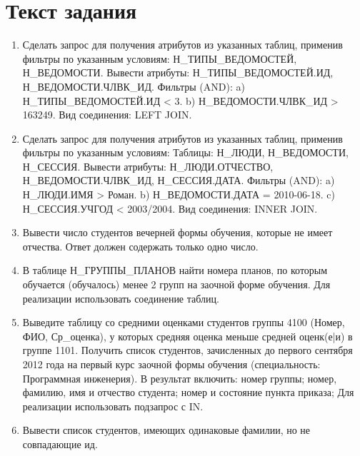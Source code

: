 \documentclass{article}
\begin{document}
\itmo[
  variant=1513,
  labn=2,
  discipline=Информационные системы и базы данных,
  group=P3115,
  student=Владимир Мацюк,
  teacher=Горбунов Михаил Витальевич,
  year=2023,
  logo=../../lib/img/itmo.png
]

\section{Текст задания}
\begin{enumerate}
  \item Сделать запрос для получения атрибутов из указанных таблиц, применив фильтры по указанным условиям:
        Н\_ТИПЫ\_ВЕДОМОСТЕЙ, Н\_ВЕДОМОСТИ.
        Вывести атрибуты: Н\_ТИПЫ\_ВЕДОМОСТЕЙ.ИД, Н\_ВЕДОМОСТИ.ЧЛВК\_ИД.
        Фильтры (AND):
        a) Н\_ТИПЫ\_ВЕДОМОСТЕЙ.ИД < 3.
        b) Н\_ВЕДОМОСТИ.ЧЛВК\_ИД > 163249.
        Вид соединения: LEFT JOIN.
  \item Сделать запрос для получения атрибутов из указанных таблиц, применив фильтры по указанным условиям:
        Таблицы: Н\_ЛЮДИ, Н\_ВЕДОМОСТИ, Н\_СЕССИЯ.
        Вывести атрибуты: Н\_ЛЮДИ.ОТЧЕСТВО, Н\_ВЕДОМОСТИ.ЧЛВК\_ИД, Н\_СЕССИЯ.ДАТА.
        Фильтры (AND):
        a) Н\_ЛЮДИ.ИМЯ > Роман.
        b) Н\_ВЕДОМОСТИ.ДАТА = 2010-06-18.
        c) Н\_СЕССИЯ.УЧГОД < 2003/2004.
        Вид соединения: INNER JOIN.
  \item Вывести число студентов вечерней формы обучения, которые не имеет отчества.
        Ответ должен содержать только одно число.
  \item В таблице Н\_ГРУППЫ\_ПЛАНОВ найти номера планов, по которым обучается (обучалось) менее 2 групп на заочной форме обучения.
        Для реализации использовать соединение таблиц.
  \item   Выведите таблицу со средними оценками студентов группы 4100 (Номер, ФИО, Ср\_оценка), у которых средняя оценка меньше средней оценк(е|и) в группе 1101.
        Получить список студентов, зачисленных до первого сентября 2012 года на первый курс заочной формы обучения (специальность: Программная инженерия). В результат включить:
        номер группы;
        номер, фамилию, имя и отчество студента;
        номер и состояние пункта приказа;
        Для реализации использовать подзапрос с IN.
  \item Вывести список студентов, имеющих одинаковые фамилии, но не совпадающие ид.
\end{enumerate}
\lstset{language=SQL}
\end{document}
